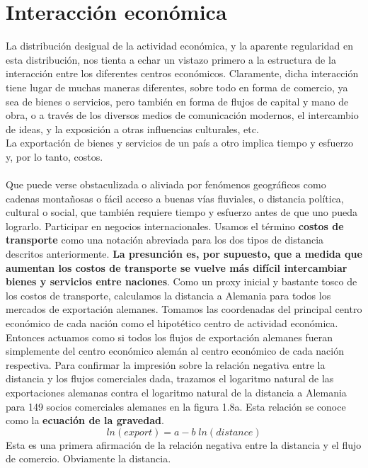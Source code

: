 \section{Interacción económica}
    La distribución desigual de la actividad económica, y la aparente regularidad en esta distribución, nos tienta a echar un vistazo primero a la estructura de la interacción entre los diferentes centros económicos. Claramente, dicha interacción tiene lugar de muchas maneras diferentes, sobre todo en forma de comercio, ya sea de bienes o servicios, pero también en forma de flujos de capital y mano de obra, o a través de los diversos medios de comunicación modernos, el intercambio de ideas, y la exposición a otras influencias culturales, etc.\\
    La exportación de bienes y servicios de un país a otro implica tiempo y esfuerzo y, por lo tanto, costos.\\\\
    Que puede verse obstaculizada o aliviada por fenómenos geográficos como cadenas montañosas o fácil acceso a buenas vías fluviales, o distancia política, cultural o social, que también requiere tiempo y esfuerzo antes de que uno pueda lograrlo. Participar en negocios internacionales. Usamos el término \textbf{costos de transporte} como una notación abreviada para los dos tipos de distancia descritos anteriormente. \textbf{La presunción es, por supuesto, que a medida que aumentan los costos de transporte se vuelve más difícil intercambiar bienes y servicios entre naciones}. Como un proxy inicial y bastante tosco de los costos de transporte, calculamos la distancia a Alemania para todos los mercados de exportación alemanes. Tomamos las coordenadas del principal centro económico de cada nación como el hipotético centro de actividad económica. Entonces actuamos como si todos los flujos de exportación alemanes fueran simplemente del centro económico alemán al centro económico de cada nación respectiva. Para confirmar la impresión sobre la relación negativa entre la distancia y los flujos comerciales dada, trazamos el logaritmo natural de las exportaciones alemanas contra el logaritmo natural de la distancia a Alemania para 149 socios comerciales alemanes en la figura 1.8a. Esta relación se conoce como la \textbf{ecuación de la gravedad}.
    $$ln(export) = a - b\; ln(distance)$$
   Esta es una primera afirmación de la relación negativa entre la distancia y el flujo de comercio. Obviamente la distancia.\\
